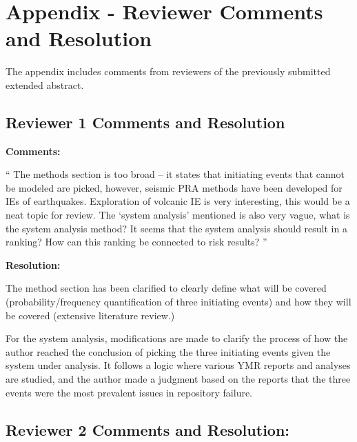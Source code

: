 \documentclass[12pt]{article}
\begin{document}
\section{Appendix - Reviewer Comments and Resolution}
The appendix includes comments from reviewers of the previously
submitted extended abstract.

\subsection{Reviewer 1 Comments and Resolution}

\textbf{Comments:}

\begin{center}
    \begin{varwidth}{0.8\textwidth}

`` The methods section is too broad – it states that initiating events that cannot be modeled are picked, however, seismic PRA methods have been developed for IEs of earthquakes. Exploration of volcanic IE is very interesting, this would be a neat topic for review. The ‘system analysis’ mentioned is also very vague, what is the system analysis method? It seems that the system analysis should result in a ranking? How can this ranking be connected to risk results? ''
    \end{varwidth}
\end{center}


\noindent \textbf{Resolution:}

The method section has been clarified to clearly define what will be
covered (probability/frequency quantification of three initiating events)
and how they will be covered (extensive literature review.)

For the system analysis, modifications are made to clarify the process
of how the author reached the conclusion of picking the three initiating 
events given the system under analysis. It follows a logic where various
\gls{YMR} reports and analyses are studied, and the author made a judgment
based on the reports that the three events were the most prevalent issues
in repository failure.

\subsection{Reviewer 2 Comments and Resolution:}
\end{document}
